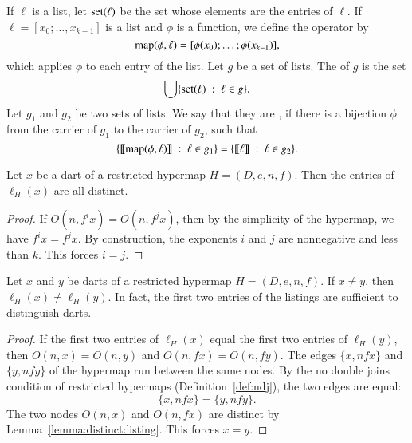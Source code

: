 \begin{definition}
  If $\ell$ is a list, let ${\operatorname{set}}(\ell)$ be the set whose elements
  are the entries of $\ell$.  If $\ell=[x_0;\ldots,x_{k-1}]$ is a list
  and $\phi$ is a function, we define the operator  by
\[
{\operatorname{map}}(\phi,\ell) = [\phi(x_0);\ldots;\phi(x_{k-1})],
\]
which applies $\phi$ to each entry of the list.  Let $g$ be a set of
lists.  The  of $g$ is the set
\[
\bigcup \{ {\operatorname{set}}(\ell) \ :\  \ell\in g\}.
\]
Let $g_1$ and $g_2$ be two sets of lists.  We say that they are
, if there is a bijection $\phi$ from the
carrier of $g_1$ to the carrier of $g_2$, such that
\[
\{ {\llbracket{{\operatorname{map}}(\phi,\ell)}\rrbracket} \ :\  \ell \in g_1 \} = 
\{ {\llbracket{\ell}\rrbracket} \ :\  \ell \in g_2 \}.
\]
\end{definition}

\begin{lemma}\label{lemma:distinct:listing}
  Let $x$ be a dart of a restricted hypermap $H=(D,e,n,f)$.  Then the
  entries of $\ell_H(x)$ are all distinct.
\end{lemma}

\begin{proof}
  If $O(n,f^i x) = O(n,f^j x)$, then by the simplicity of the
  hypermap, we have $f^i x = f^j x$.  By construction, the exponents
  $i$ and $j$ are nonnegative and less than $k$.  This forces $i=j$.
\end{proof}

\begin{lemma}\label{lemma:list-u}
  Let $x$ and $y$ be darts of a restricted hypermap $H=(D,e,n,f)$.  If
  $x\ne y$, then $\ell_H(x)\ne \ell_H(y)$.  In fact, the first two
  entries of the listings are sufficient to distinguish darts.
\end{lemma}

\begin{proof}
  If the first two entries of $\ell_H(x)$ equal the first two entries
  of $\ell_H(y)$, then $O(n,x)=O(n,y)$ and $O(n,fx) = O(n,fy)$.  The
  edges $\{x,n f x\}$ and $\{y, n f y\}$ of the hypermap run between
  the same nodes.  By the no double joins condition of restricted
  hypermaps (Definition~\ref{def:ndj}), the two edges are equal:
\[
\{x,n f x\} = \{y, n f y\}.
\]
The two nodes $O(n,x)$ and $O(n,f x)$ are distinct by Lemma~\ref{lemma:distinct:listing}.  This forces $x=y$.
\end{proof}

